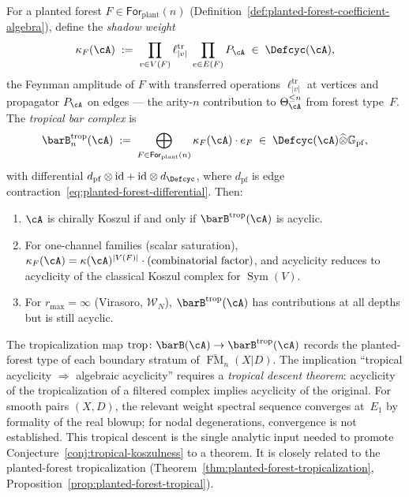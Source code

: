 \begin{conjecture}
\label{conj:tropical-koszulness}
\ClaimStatusConjectured
{}
For a planted forest
$F \in \mathsf{For}_{\mathrm{plant}}(n)$
\textup{(}Definition~\textup{\ref{def:planted-forest-coefficient-algebra})},
define the \emph{shadow weight}
\begin{equation}
\label{eq:shadow-weight-on-forest}
\kappa_F(\cA)
\;:=\;
\prod_{v \in V(F)}
\ell_{|v|}^{\mathrm{tr}}
\;\prod_{e \in E(F)} P_\cA
\;\in\; \Defcyc(\cA),
\end{equation}
the Feynman amplitude of $F$ with transferred operations
$\ell_{|v|}^{\mathrm{tr}}$ at vertices and propagator
$P_\cA$ on edges --- the arity-$n$ contribution to
$\Theta_\cA^{\leq n}$ from forest type~$F$.
The \emph{tropical bar complex} is
\begin{equation}
\label{eq:tropical-bar-complex}
\barB^{\mathrm{trop}}_n(\cA)
\;:=\;
\bigoplus_{F \in \mathsf{For}_{\mathrm{plant}}(n)}
\kappa_F(\cA) \cdot e_F
\;\in\;
\Defcyc(\cA) \widehat\otimes \mathbb{G}_{\mathrm{pf}},
\end{equation}
with differential
$d_{\mathrm{pf}} \otimes \mathrm{id}
+ \mathrm{id} \otimes d_{\Defcyc}$,
where $d_{\mathrm{pf}}$ is edge
contraction~\eqref{eq:planted-forest-differential}.
Then:
\begin{enumerate}[label=\textup{(\roman*)}]
\item $\cA$ is chirally Koszul if and only if
  $\barB^{\mathrm{trop}}(\cA)$ is acyclic.
\item For one-channel families (scalar saturation),
  $\kappa_F(\cA) = \kappa(\cA)^{|V(F)|} \cdot
  (\text{combinatorial factor})$, and acyclicity
  reduces to acyclicity of the classical Koszul
  complex for $\operatorname{Sym}(V)$.
\item For $r_{\max} = \infty$ (Virasoro,
  $\mathcal{W}_N$), $\barB^{\mathrm{trop}}(\cA)$
  has contributions at all depths but is still acyclic.
\end{enumerate}
\end{conjecture}

\begin{remark}
\label{rem:tropical-descent-gap}
The tropicalization map
$\mathrm{trop}\colon \barB(\cA)
\to \barB^{\mathrm{trop}}(\cA)$
records the planted-forest type of each boundary stratum
of $\overline{\operatorname{FM}}_n(X|D)$.
The implication ``tropical acyclicity $\Rightarrow$
algebraic acyclicity'' requires a \emph{tropical descent
theorem}: acyclicity of the tropicalization of a
filtered complex implies acyclicity of the original.
For smooth pairs $(X,D)$, the relevant weight spectral
sequence converges at~$E_1$ by formality of the real
blowup; for nodal degenerations, convergence is not
established.  This tropical descent is the single
analytic input needed to promote
Conjecture~\ref{conj:tropical-koszulness} to a theorem.
It is closely related to the planted-forest
tropicalization
(Theorem~\ref{thm:planted-forest-tropicalization},
Proposition~\ref{prop:planted-forest-tropical}).
\end{remark}

